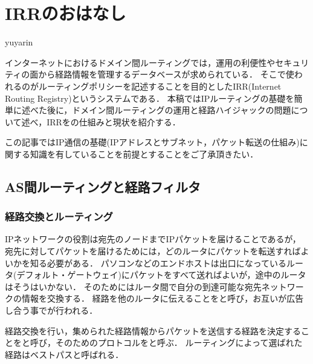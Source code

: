
\chapter{IRRのおはなし}

\begin{flushright}
 {\headfont yuyarin} %
\end{flushright}

インターネットにおけるドメイン間ルーティングでは，運用の利便性やセキュリティの面から経路情報を管理するデータベースが求められている．
そこで使われるのがルーティングポリシーを記述することを目的としたIRR(Internet Routing Registry)というシステムである．
本稿ではIPルーティングの基礎を簡単に述べた後に，ドメイン間ルーティングの運用と経路ハイジャックの問題について述べ，IRRをの仕組みと現状を紹介する．

この記事ではIP通信の基礎(IPアドレスとサブネット，パケット転送の仕組み)に関する知識を有していることを前提とすることをご了承頂きたい．

\section{AS間ルーティングと経路フィルタ}

\subsection{経路交換とルーティング}

IPネットワークの役割は宛先のノードまでIPパケットを届けることであるが，
宛先に対してパケットを届けるためには，どのルータにパケットを転送すればよいかを知る必要がある．
パソコンなどのエンドホストは出口になっているルータ(デフォルト・ゲートウェイ)にパケットをすべて送ればよいが，途中のルータはそうはいかない．
そのためにはルータ間で自分の到達可能な宛先ネットワークの情報を交換する．
経路を他のルータに伝えることをと呼び，お互いが広告し合う事でが行われる．

経路交換を行い，集められた経路情報からパケットを送信する経路を決定することをと呼び，そのためのプロトコルをと呼ぶ．
ルーティングによって選ばれた経路はベストパスと呼ばれる．

